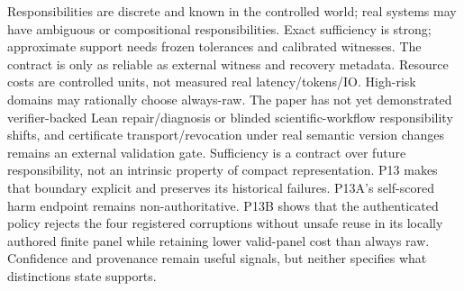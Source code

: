 \markdownRendererDocumentBegin
\markdownRendererSectionBegin
{}\markdownRendererInterblockSeparator
{}Responsibilities are discrete and known in the controlled world; real systems may have ambiguous or compositional responsibilities. Exact sufficiency is strong; approximate support needs frozen tolerances and calibrated witnesses. The contract is only as reliable as external witness and recovery metadata. Resource costs are controlled units, not measured real latency/tokens/IO. High-risk domains may rationally choose always-raw. The paper has not yet demonstrated verifier-backed Lean repair/diagnosis or blinded scientific-workflow responsibility shifts, and certificate transport/revocation under real semantic version changes remains an external validation gate.\markdownRendererInterblockSeparator
{}Sufficiency is a contract over future responsibility, not an intrinsic property of compact representation. P13 makes that boundary explicit and preserves its historical failures. P13A's self-scored harm endpoint remains non-authoritative. P13B shows that the authenticated policy rejects the four registered corruptions without unsafe reuse in its locally authored finite panel while retaining lower valid-panel cost than always raw. Confidence and provenance remain useful signals, but neither specifies what distinctions state supports.\markdownRendererInterblockSeparator
{}
\markdownRendererSectionEnd \markdownRendererDocumentEnd